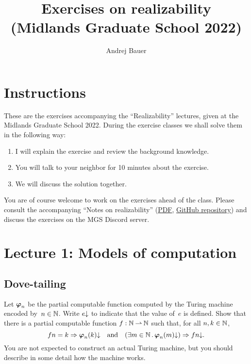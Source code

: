 \documentclass{article}
\title{Exercises on realizability\\
(Midlands Graduate School 2022)}
\author{Andrej Bauer}
\begin{document}
\maketitle

\section*{Instructions}
\label{sec:instructions}

These are the exercises accompanying the ``Realizability'' lectures, given at the Midlands Graduate School 2022.
During the exercise classes we shall solve them in the following way:
%
\begin{enumerate}
\item I will explain the exercise and review the background knowledge.
\item You will talk to your neighbor for 10 minutes about the exercise.
\item We will discuss the solution together.
\end{enumerate}
%
You are of course welcome to work on the exercises ahead of the class. Please consult the accompanying ``Notes on realizability'' (\href{http://www.andrej.com/zapiski/MGS-2022/notes-on-realizability.pdf}{PDF}, \href{https://github.com/andrejbauer/notes-on-realizability}{GitHub repository}) and discuss the exercises on the
MGS Discord server.

\section{Lecture 1: Models of computation}
\label{sec:models-computation}

\subsection{Dove-tailing}
\label{sec:dove-tailing}

Let $\text{\boldmath{$\varphi$}}_n$ be the partial computable function computed by the Turing machine encoded by~$n \in \mathbb{N}$.
Write $e{\downarrow}$ to indicate that the value of~$e$ is defined.
%
Show that there is a partial computable function $f : \mathbb{N} \mathbin{\rightharpoonup} \mathbb{N}$ such that, for all $n, k \in \mathbb{N}$,
%
\begin{equation*}
f n = k \Rightarrow \text{\boldmath{$\varphi$}}_{n}(k){\downarrow}
\quad\text{and}\quad
(\exists m \in \mathbb{N} \,.\, \text{\boldmath{$\varphi$}}_{n}(m){\downarrow}) \Rightarrow f n{\downarrow}.
\end{equation*}
%
You are not expected to construct an actual Turing machine, but you should describe in some detail how the machine works.
\end{document}
